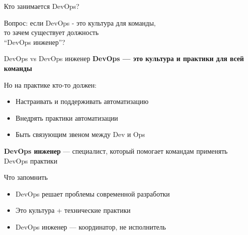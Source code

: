 \documentclass[aspectratio=169]{beamer}
\begin{document}
    \begin{frame}{Кто занимается DevOps?}
        \begin{center}
            \Large
            Вопрос: если DevOps - это культура для команды, \\
            то зачем существует должность \\
            \enquote{DevOps инженер}?
        \end{center}
    \end{frame}

    \begin{frame}{DevOps vs DevOps инженер}
        \textbf{DevOps — это культура и практики для всей команды}

        \vspace{0.5cm}

        Но на практике кто-то должен:
        \begin{itemize}
            \item Настраивать и поддерживать автоматизацию
            \item Внедрять практики автоматизации
            \item Быть связующим звеном между Dev и Ops
        \end{itemize}

        \vspace{0.5cm}

        \textbf{DevOps инженер} — специалист, который помогает командам применять DevOps практики
    \end{frame}

    \begin{frame}{Что запомнить}
        \begin{itemize}
            \item DevOps решает проблемы современной разработки
            \item Это культура + технические практики
            \item DevOps инженер — координатор, не исполнитель
        \end{itemize}
    \end{frame}
\end{document}
